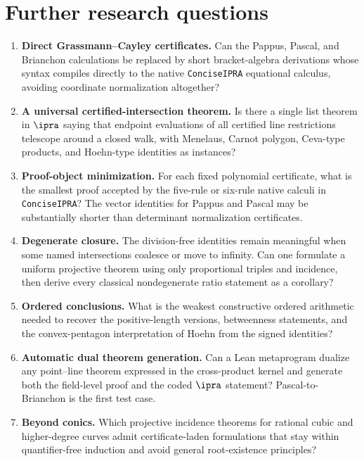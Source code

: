 \section{Further research questions}

\begin{enumerate}
\item \textbf{Direct Grassmann--Cayley certificates.}
Can the Pappus, Pascal, and Brianchon calculations be replaced by short
bracket-algebra derivations whose syntax compiles directly to the native
\texttt{ConciseIPRA} equational calculus, avoiding coordinate normalization
altogether?

\item \textbf{A universal certified-intersection theorem.}
Is there a single list theorem in $\ipra$ saying that endpoint evaluations of
all certified line restrictions telescope around a closed walk, with
Menelaus, Carnot polygon, Ceva-type products, and Hoehn-type identities as
instances?

\item \textbf{Proof-object minimization.}
For each fixed polynomial certificate, what is the smallest proof accepted by
the five-rule or six-rule native calculi in \texttt{ConciseIPRA}?  The vector
identities for Pappus and Pascal may be substantially shorter than determinant
normalization certificates.

\item \textbf{Degenerate closure.}
The division-free identities remain meaningful when some named intersections
coalesce or move to infinity.  Can one formulate a uniform projective theorem
using only proportional triples and incidence, then derive every classical
nondegenerate ratio statement as a corollary?

\item \textbf{Ordered conclusions.}
What is the weakest constructive ordered arithmetic needed to recover the
positive-length versions, betweenness statements, and the convex-pentagon
interpretation of Hoehn from the signed identities?

\item \textbf{Automatic dual theorem generation.}
Can a Lean metaprogram dualize any point--line theorem expressed in the
cross-product kernel and generate both the field-level proof and the coded
$\ipra$ statement?  Pascal-to-Brianchon is the first test case.

\item \textbf{Beyond conics.}
Which projective incidence theorems for rational cubic and higher-degree
curves admit certificate-laden formulations that stay within quantifier-free
induction and avoid general root-existence principles?
\end{enumerate}
